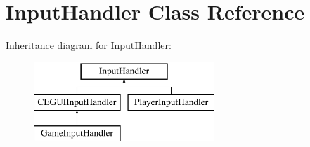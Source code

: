 \hypertarget{classInputHandler}{
\section{\-Input\-Handler \-Class \-Reference}
\label{db/df6/classInputHandler}
}
\-Inheritance diagram for \-Input\-Handler\-:\begin{figure}[H]
\begin{center}
\leavevmode
\includegraphics[height=3.000000cm]{db/df6/classInputHandler}
\end{center}
\end{figure}

